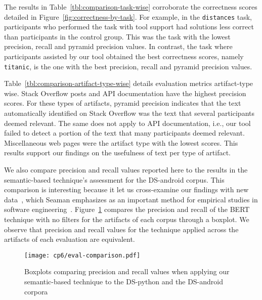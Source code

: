 The results in Table~\ref{tbl:comparison-task-wise} corroborate 
the correctness scores detailed in Figure~\ref{fig:correctness-by-task}. For example, 
in the \texttt{distances} task, participants who performed the task with tool support had solutions less correct than participants in the control group.
This was the task with the lowest precision, recall and pyramid precision values. 
In contrast, the task where participants assisted by our tool obtained the best correctness scores, namely \texttt{titanic}, is the one with the best precision, recall and pyramid precision values.








Table~\ref{tbl:comparison-artifact-type-wise} details evaluation metrics artifact-type wise. 
Stack Overflow posts and API documentation have the highest precision scores. For these types of artifacts, pyramid precision indicates that the 
text automatically identified on Stack Overflow was the text that several participants deemed relevant. 
The same does not apply to API documentation, i.e., our tool failed to detect a portion of the text that many participants deemed relevant. 
Miscellaneous web pages were the artifact type with the lowest scores. This results support our findings 
on the usefulness of text per type of artifact.






We also compare precision and recall values reported here to the results in the semantic-based technique's assessment for the \acs{DS-android} corpus. 
This comparison is interesting because it let us cross-examine our findings with new data~\cite{easterbrook2008},
which Seaman emphasizes as an important method for empirical studies in software engineering~\cite{Seaman1999}.
Figure~\ref{fig:eval-comparison} compares the precision and recall of the BERT technique with no filters 
for the artifacts of each corpus through a boxplot. We observe that precision 
and recall values for the technique applied 
across the artifacts of each evaluation are equivalent. 







\medskip
\begin{figure}
    \centering
    \texttt{[image: cp6/eval-comparison.pdf]}
    \caption{Boxplots comparing precision and recall values when applying our semantic-based technique to the \acs{DS-python} and the \acs{DS-android} corpora}
    \label{fig:eval-comparison}
\end{figure}


\clearpage
